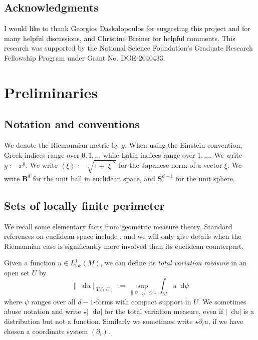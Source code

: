 \documentclass[reqno,11pt]{amsart}
\newcommand{\Sph}{\mathbf S}
\newcommand{\Ball}{\mathbf{B}}
\newcommand*\dif{\mathop{}\!\mathrm{d}}
\newcommand{\dfn}[1]{\emph{#1}\index{#1}}
\newcommand{\loc}{\mathrm{loc}}
\def\Japan#1{\left \langle #1 \right \rangle}
\theoremstyle{definition}
\numberwithin{equation}{section}
\begin{document}

\subsection{Acknowledgments}
I would like to thank Georgios Daskalopoulos for suggesting this project and for many helpful discussions, and Christine Breiner for helpful comments.
This research was supported by the National Science Foundation's Graduate Research Fellowship Program under Grant No. DGE-2040433.

\section{Preliminaries}\label{Prelims}
\subsection{Notation and conventions}
We denote the Riemannian metric by $g$.
When using the Einstein convention, Greek indices range over $0, 1, \dots$ while Latin indices range over $1, \dots$.
We write $y := x^0$.
We write $\Japan \xi := \sqrt{1 + |\xi|^2}$ for the Japanese norm of a vector $\xi$.
We write $\Ball^d$ for the unit ball in euclidean space, and $\Sph^{d - 1}$ for the unit sphere.

\subsection{Sets of locally finite perimeter}
We recall some elementary facts from geometric measure theory.
Standard references on euclidean space include \cite{simon1983GMT,Giusti77}, and we will only give details when the Riemannian case is significantly more involved than its euclidean counterpart.

Given a function $u \in L^1_\loc(M)$, we can define its \dfn{total variation measure} in an open set $U$ by
$$\|\dif u\|_{TV(U)} := \sup_{\|\psi\|_{C^0} \leq 1} \int_M u \dif \psi$$
where $\psi$ ranges over all $d-1$-forms with compact support in $U$.
We sometimes abuse notation and write $\star |\dif u|$ for the total variation measure, even if $|\dif u|$ is a distribution but not a function.
Similarly we sometimes write $\star \partial_i u$, if we have chosen a coordinate system $(\partial_i)$.
\end{document}
